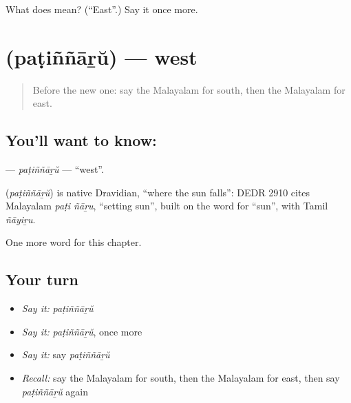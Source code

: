 \begin{tcolorbox}[breakable,colback=teal!4,colframe=teal!35!black,title={Before you move on}]
What does  mean? (\textquotedblleft{}East\textquotedblright{}.) Say it once more.
\end{tcolorbox}
\section[\texorpdfstring{\ml{പടിഞ്ഞാറ്} (paṭiññāṟŭ)}{പടിഞ്ഞാറ് (paṭiññāṟŭ)}]{ (paṭiññāṟŭ) — west}

\label{lesson:ML-C198-patinnaru}



\begin{quote}
Before the new one: say the Malayalam for south, then the Malayalam for east.
\end{quote}

\subsection*{You'll want to know: }
\textbf{} — \emph{paṭiññāṟŭ} — \textquotedblleft{}west\textquotedblright{}.

\begin{cousinweb}
\textbf{} (\emph{paṭiññāṟŭ}) is native Dravidian, \textquotedblleft{}where the sun falls\textquotedblright{}: DEDR 2910 cites Malayalam \emph{paṭi ñāṟu}, \textquotedblleft{}setting sun\textquotedblright{}, built on the word for \textquotedblleft{}sun\textquotedblright{}, with Tamil \emph{ñāyiṟu}.
\end{cousinweb}

\begin{grammarlens}[title={What you've built}]
One more word for this chapter.
\end{grammarlens}

\subsection*{Your turn}
\begin{itemize}
\raggedright
  \item \emph{Say it:} \emph{paṭiññāṟŭ}
  \item \emph{Say it:} \emph{paṭiññāṟŭ}, once more
  \item \emph{Say it:} say \emph{paṭiññāṟŭ}
  \item \emph{Recall:} say the Malayalam for south, then the Malayalam for east, then say \emph{paṭiññāṟŭ} again
\end{itemize}

